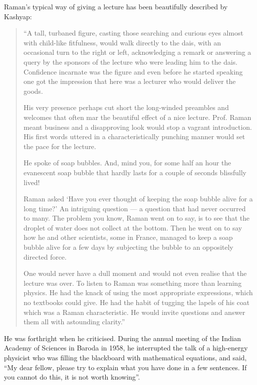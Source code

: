 Raman's typical way of giving a lecture has been beautifully described by Kashyap:
\begin{quote}
{\fontsize{10pt}{11.7pt}\selectfont
``A tall, turbaned figure, casting those searching and curious eyes almost with child-like fitfulness, would walk directly to the dais, with an occasional turn to the right or left, acknowledging a remark or answering a query by the sponsors of the lecture who were leading him to the dais. Confidence incarnate was the figure and even before he started speaking one got the impression that here was a lecturer who would deliver the goods.


His very presence perhaps cut short the long-winded preambles and welcomes that often mar the beautiful effect of a nice lecture. Prof. Raman meant business and a disapproving look would stop a vagrant introduction. His first words uttered in a characteristically punching manner would set the pace for the lecture.

He spoke of soap bubbles. And, mind you, for some half an hour the evanescent soap bubble that hardly lasts for a couple of seconds blissfully lived!

Raman asked `Have you ever thought of keeping the soap bubble alive for a long time?' An intriguing question --- a question that had never occurred to many. The problem you know, Raman went on to say, is to see that the droplet of water does not collect at the bottom. Then he went on to say how he and other scientists, some in France, managed to keep a soap bubble alive for a few days by subjecting the bubble to an oppositely directed force.

One would never have a dull moment and would not even realise that the lecture was over. To listen to Raman was something more than learning physics. He had the knack of using the most appropriate expressions, which no textbooks could give. He had the habit of tugging the lapels of his coat which was a Raman characteristic. He would invite questions and answer them all with astounding clarity.''}\relax
\end{quote}

He was forthright when he criticised. During the annual meeting of the Indian Academy of Sciences in Baroda in 1958, he interrupted the talk of a high-energy physicist who was filling the blackboard with mathematical equations, and said, ``My dear fellow, please try to explain what you have done in a few sentences. If you cannot do this, it is not worth knowing''.

